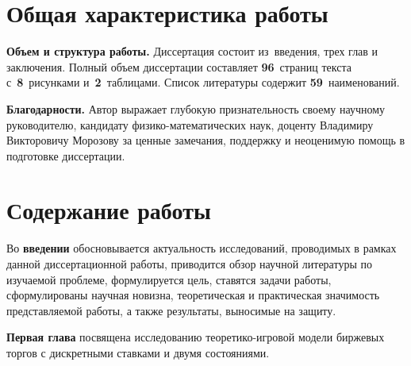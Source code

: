 
\section*{Общая характеристика работы}

\newcommand{\emphasis}[1]{\textbf{{#1}}}
\newcommand{\actuality}{\emphasis{\actualityTXT}}
\newcommand{\progress}{\emphasis{\progressTXT}}
\newcommand{\aim}{\emphasis{\aimTXT}}
\newcommand{\tasks}{\emphasis{\tasksTXT}}
\newcommand{\researchsubject}{\emphasis{\researchsubjectTXT}}
\newcommand{\novelty}{\emphasis{\noveltyTXT}}
\newcommand{\influence}{\emphasis{\influenceTXT}}
\newcommand{\methods}{\emphasis{\methodsTXT}}
\newcommand{\defpositions}{\emphasis{\defpositionsTXT}}
\newcommand{\reliability}{\emphasis{\reliabilityTXT}}
\newcommand{\probation}{\emphasis{\probationTXT}}
\newcommand{\contribution}{\emphasis{\contributionTXT}}
\newcommand{\publications}{\emphasis{\publicationsTXT}}



\emphasis{Объем и структура работы.}
Диссертация состоит из~введения, трех глав и заключения.
Полный объем диссертации составляет \textbf{96}~страниц текста с~\textbf{8}~рисунками и~\textbf{2}~таблицами.
Список литературы содержит \textbf{59}~наименований.

\textbf{Благодарности.} Автор выражает глубокую признательность своему научному руководителю, кандидату физико-математических наук, доценту Владимиру Викторовичу Морозову за ценные замечания, поддержку и неоценимую помощь в подготовке диссертации.

\section*{Содержание работы}
Во \emphasis{введении} обосновывается актуальность исследований, проводимых в рамках данной диссертационной работы, приводится обзор научной литературы по изучаемой проблеме, формулируется цель, ставятся задачи работы, сформулированы научная новизна, теоретическая и практическая значимость представляемой работы, а также результаты, выносимые на защиту.

\emphasis{Первая глава} посвящена исследованию теоретико-игровой модели биржевых торгов с дискретными ставками и двумя состояниями.

